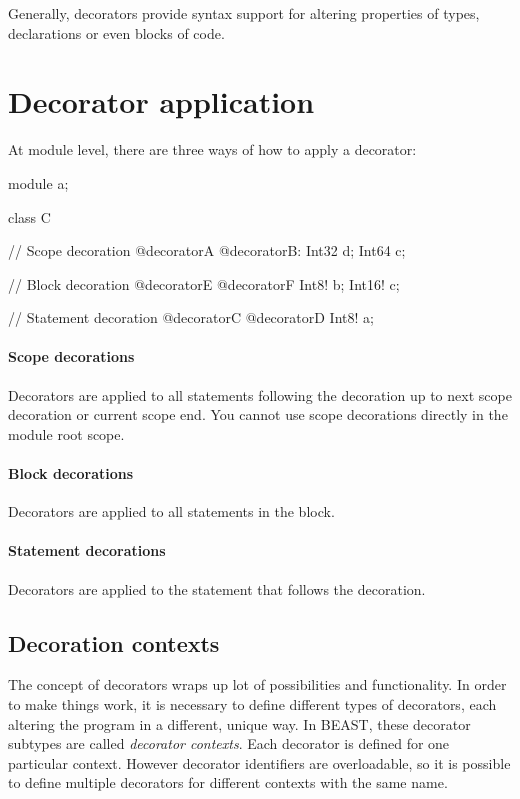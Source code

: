 Generally, decorators provide syntax support for altering properties of types, declarations or even blocks of code.

\section{Decorator application}
At module level, there are three ways of how to apply a decorator:
\begin{code}
module a;

class C {
	
// Scope decoration
@decoratorA @decoratorB:
	Int32 d;
	Int64 c;
	
	// Block decoration
	@decoratorE @decoratorF {
		Int8! b;
		Int16! c;	
	}
	
	// Statement decoration
	@decoratorC @decoratorD Int8! a;
				
}
\end{code}

\paragraph{Scope decorations} Decorators are applied to all statements following the decoration up to next scope decoration or current scope end. You cannot use scope decorations directly in the module root scope.

\paragraph{Block decorations} Decorators are applied to all statements in the block.

\paragraph{Statement decorations} Decorators are applied to the statement that follows the decoration.

\subsection{Decoration contexts} \label{decorationContexts}
The concept of decorators wraps up lot of possibilities and functionality. In order to make things work, it is necessary to define different types of decorators, each altering the program in a different, unique way. In BEAST, these decorator subtypes are called \textit{decorator contexts}. Each decorator is defined for one particular context. However decorator identifiers are overloadable, so it is possible to define multiple decorators for different contexts with the same name.

